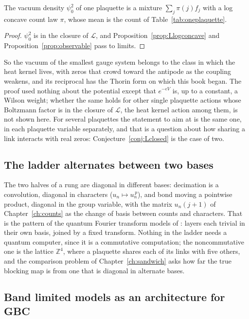 \begin{corollary}\label{cor:vacuumcount}
The vacuum density $\psi_0^2$ of one plaquette is a mixture $\sum_j\pi(j)f_j$ with a log concave count law $\pi$, whose mean is the count of Table~\ref{tab:oneplaquette}.
\end{corollary}

\begin{proof}
$\psi_0^2$ is in the closure of $\mathcal L$, and Proposition~\ref{prop:Llogconcave} and Proposition~\ref{prop:observable} pass to limits.
\end{proof}

So the vacuum of the smallest gauge system belongs to the class in which the heat kernel lives, with zeros that crowd toward the antipode as the coupling weakens, and its reciprocal has the Thorin form on which this book began. The proof used nothing about the potential except that $e^{-\epsilon V}$ is, up to a constant, a Wilson weight; whether the same holds for other single plaquette actions whose Boltzmann factor is in the closure of $\mathcal L$, the heat kernel action among them, is not shown here. For several plaquettes the statement to aim at is the same one, in each plaquette variable separately, and that is a question about how sharing a link interacts with real zeros: Conjecture~\ref{conj:Lclosed} is the case of two.

\subsection{The ladder alternates between two bases}

The two halves of a rung are diagonal in different bases: decimation is a convolution, diagonal in characters ($u_n\mapsto u_n^{\,p}$), and bond moving a pointwise product, diagonal in the group variable, with the matrix $u_n(j+1)$ of Chapter~\ref{ch:counts} as the change of basis between counts and characters. That is the pattern of the quantum Fourier transform models of \cite{PSX23}: layers each trivial in their own basis, joined by a fixed transform. Nothing in the ladder needs a quantum computer, since it is a commutative computation; the noncommutative one is the lattice $\mathbb Z^4$, where a plaquette shares each of its links with five others, and the comparison problem of Chapter~\ref{ch:sandwich} asks how far the true blocking map is from one that is diagonal in alternate bases.

\subsection{Band limited models as an architecture for GBC}

